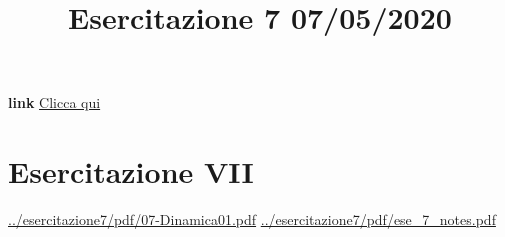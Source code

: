 \title{Esercitazione 7 07/05/2020}\newline
\textbf{link} \href{https://web.microsoftstream.com/video/0b9f9350-a8e9-4502-8400-a731263975b5}{Clicca qui}
\section{Esercitazione VII}
\url{../esercitazione7/pdf/07-Dinamica01.pdf}\newline
\url{../esercitazione7/pdf/ese_7_notes.pdf}